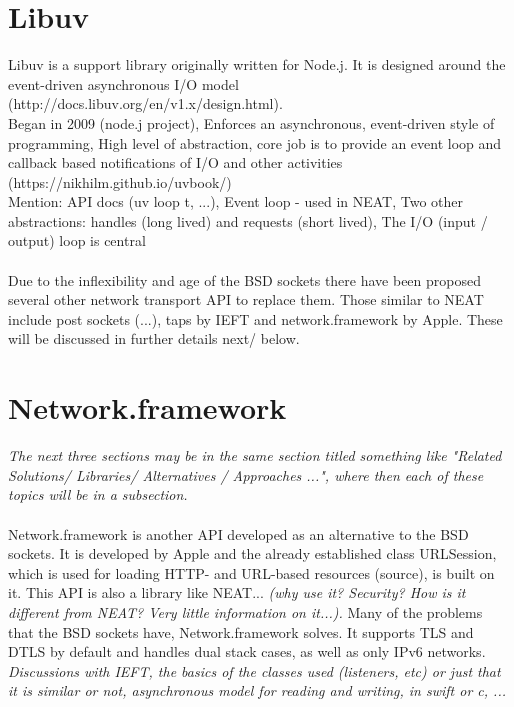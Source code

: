\documentclass[12pt]{report}
\begin{document}
\section{Libuv}
Libuv is a support library originally written for Node.j. It is designed around the event-driven asynchronous I/O model \\
(http://docs.libuv.org/en/v1.x/design.html). 
\\
Began in 2009 (node.j project),
Enforces an asynchronous, event-driven style of programming,
High level of abstraction,
core job is to provide an event loop and callback based notifications of I/O and other activities \\(https://nikhilm.github.io/uvbook/)
\\
Mention:
API docs (uv loop t, ...),
Event loop - used in NEAT,
Two other abstractions: handles (long lived) and requests (short lived),
The I/O (input / output) loop is central
\\
\\
Due to the inflexibility and age of the BSD sockets there have been proposed several other network transport API to replace them. Those similar to NEAT include post sockets (...), taps by IEFT  and network.framework by Apple. These will be discussed in further details next/ below.

\section{Network.framework}
\textit{The next three sections may be in the same section titled something like "Related Solutions/ Libraries/ Alternatives / Approaches ...", where then each of these topics will be in a subsection.}\\ \\
Network.framework is another API developed as an alternative to the BSD sockets. It is developed by Apple and the already established class URLSession, which is used for loading HTTP- and URL-based resources (source), is built on it. This API is also a library like NEAT... 
\textit{(why use it? Security? How is it different from NEAT? Very little information on it...).}
Many of the problems that the BSD sockets have, Network.framework solves. It supports TLS and DTLS by default and handles dual stack cases, as well as only IPv6 networks.
\textit{Discussions with IEFT, the basics of the classes used (listeners, etc) or just that it is similar or not, asynchronous model for reading and writing, in swift or c, ...}
\end{document}
